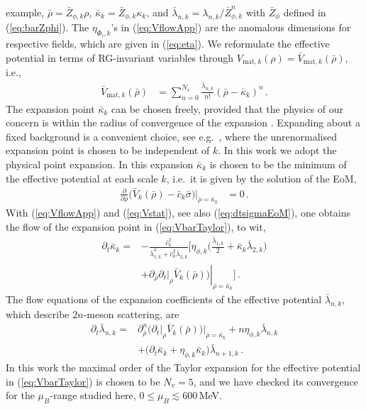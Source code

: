 \documentclass[%
reprint,
superscriptaddress,
showpacs,preprintnumbers,
 amsmath,amssymb,
 aps,
prd,
]{revtex4-1}
\def\eq#1{(\ref{#1})}
\begin{document}
example, $\bar\rho= \bar Z_{\phi,k} \rho$,
$\bar\kappa_k= \bar Z_{\phi,k} \kappa_k$, and
$\bar{\lambda}_{n,k}=\lambda_{n,k}/\bar Z_{\phi,k}^n$ with
$\bar Z_\phi$ defined in \eq{eq:barZphi}. The
$\eta^{\ }_{\Phi_i, k}$'s in \eq{eq:VflowApp} are the anomalous
dimensions for respective fields, which are given in \eq{eq:eta}.  We
reformulate the effective potential in terms of RG-invariant variables
through
$V_{\mathrm{mat}, k}(\rho)=\bar V_{\mathrm{mat}, k}(\bar \rho)$, i.e.,
%
\begin{align}
  \bar V_{\mathrm{mat}, k}(\bar \rho)
  &=\sum_{n=0}^{N_v}\frac{\bar
    \lambda_{n,k}}{n!}(\bar \rho-\bar \kappa_k)^n\,.
                         \label{eq:VbarTaylor}
\end{align}
%
The expansion point $\bar \kappa_k$ can be chosen freely, provided
that the physics of our concern is within the radius of convergence of
the expansion \cite{Pawlowski:2014zaa}. Expanding about a fixed
background is a convenient choice, see e.g.\ \cite{Pawlowski:2014zaa,
  Braun:2014ata, Fu:2015naa, Rennecke:2016tkm}, where the
unrenormalised expansion point is chosen to be independent of $k$. In
this work we adopt the physical point expansion. In this expansion
$\bar \kappa_k$ is chosen to be the minimum of the effective potential
at each scale $k$, i.e.\ it is given by the solution of the EoM,
%
\begin{align}
  \frac{\partial}{\partial \bar \rho}\Big(\bar V_{k}(\bar \rho)-\bar c_k
  \bar \sigma \Big)\bigg \vert_{\bar\rho=\bar \kappa_k}&=0\,. \label{eq:Vstat}
\end{align}
%
With (\ref{eq:VflowApp}) and (\ref{eq:Vstat}), see also
\eq{eq:dtsigmaEoM}, one obtains the flow of the expansion point in
\eq{eq:VbarTaylor}, to wit, 
%
\begin{align}
  \partial_t \bar \kappa_k=&-\frac{\bar c_k^2}{\bar \lambda_{1,k}^3+
                             \bar c_k^2 \bar \lambda_{2,k}}\bigg[\eta_{\phi,k}
                             \Big(\frac{\bar \lambda_{1,k}}{2}+\bar\kappa_k
                             \bar \lambda_{2,k}\Big)\nonumber \\[1ex] 
                           &+\left. \partial_{\bar\rho} \partial_{t}\big|_{\rho}
                             \bar V_{k}(\bar \rho)\big)\right|_{\bar\rho=\bar \kappa_k}
                             \bigg]\,.\label{}
\end{align}
%
The flow equations of the expansion coefficients of the effective
potential $\bar\lambda_{n,k}$, which describe $2n$-meson scattering,
are
%
\begin{align}
  \partial_t \bar\lambda_{n,k}=
  &\partial_{\bar\rho}^n
    \big(\partial_{t}\big|_{\rho}
    \bar V_{k}(\bar \rho)\big)
    \Big |_{\bar\rho=\bar \kappa_k}+
    n\eta_{\phi,k}\bar\lambda_{n,k}\nonumber \\[1ex] 
  &+\big(\partial_t \bar \kappa_k+\eta_{\phi,k}
    \bar\kappa_k\big)\bar\lambda_{n+1,k}\,. \label{}
\end{align}
%
In this work the maximal order of the Taylor expansion for the
effective potential in \eq{eq:VbarTaylor} is chosen to be $N_v=5$, and
we have checked its convergence for the $\mu_B$-range studied here,
$0\leq \mu_B \lesssim 600$\,MeV.
\end{document}
